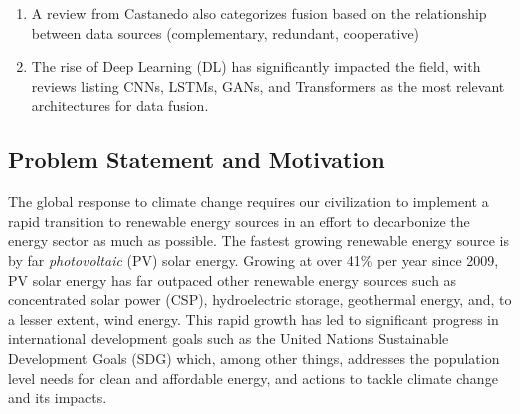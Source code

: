 \begin{multicols}{2}
\begin{enumerate}
\begin{itemize}
    \end{itemize}
    \item  A review from Castanedo\cite{Castanedo_trad_data_fusion_2013} also categorizes fusion based on the relationship between data sources (complementary, redundant, cooperative)
    \item The rise of Deep Learning (DL) has significantly impacted the field, with reviews listing CNNs, LSTMs, GANs, and Transformers as the most relevant architectures for data fusion\cite{Li_DL_multimodal_RS_data_fusion_review_2022}\cite{Hussain_DL_Data_Fusion_review_2024}.
\end{enumerate}

\subsection{Problem Statement and Motivation} 
The global response to climate change requires our civilization to implement a rapid transition to renewable energy sources in an effort to 
decarbonize the energy sector as much as possible. The fastest growing renewable energy source is by far \textit{photovoltaic} (PV) solar energy. Growing at over 41\% per year since 2009\cite{kruitwagen_global_inventory_pv_units_2021},
PV solar energy has far outpaced other renewable energy sources such as concentrated solar power (CSP), hydroelectric storage, geothermal energy, and, to a lesser extent, wind energy. 
This rapid growth has led to significant progress in international development goals such as the United Nations Sustainable Development Goals (SDG) which, among other things, 
addresses the population level needs for clean and affordable energy, and actions to tackle climate change and its impacts\cite{maxar_germany_pv_dataset}. 


\end{multicols}
